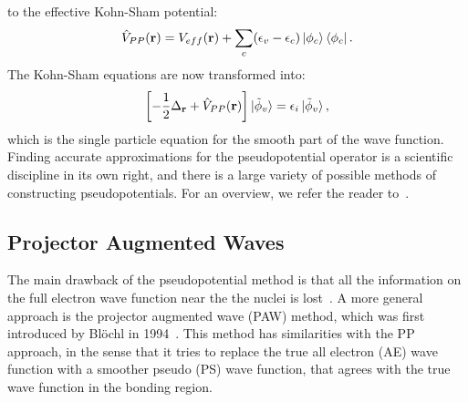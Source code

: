 \begin{refsection}
to the effective Kohn-Sham potential:
\begin{equation}
\hat{V}_{PP}(\mathbf{r}) = V_{eff}(\mathbf{r}) + \sum_c (\epsilon_v - \epsilon_c) \ket{\phi_c} \bra{\phi_c}.
\end{equation}
The Kohn-Sham equations are now transformed into:
\begin{equation}
\left[- \frac{1}{2} \Delta_{\mathbf{r}} + \hat{V}_{PP}(\mathbf{r}) \right]\ket{\tilde{\phi}_v} = \epsilon_i \ket{\tilde{\phi}_v},
\end{equation}
which is the single particle equation for the smooth part of the wave function. Finding accurate approximations for the pseudopotential operator is a scientific discipline in its own right, and there is a large variety of possible methods of constructing pseudopotentials. For an overview, we refer the reader to~\cite{Singh2006}.

\subsection{Projector Augmented Waves} \label{dft:sec-PAW}

The main drawback of the pseudopotential method is that all the information on the full electron wave function near the the nuclei is lost~\cite{Rostgaard2009}. A more general approach is the projector augmented wave (PAW) method, which was first introduced by Bl\"ochl in 1994~\cite{Blochl1994a}. This method has similarities with the PP approach, in the sense that it tries to replace the true all electron (AE) wave function with a smoother pseudo (PS) wave function, that agrees with the true wave function in the bonding region.


\end{refsection}
